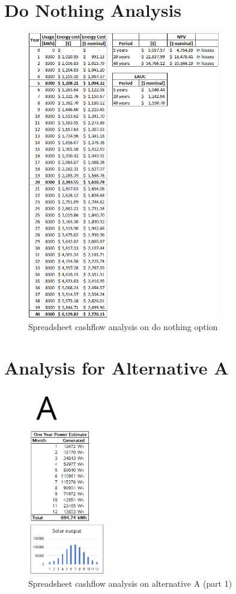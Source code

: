 \documentclass[10pt,letterpaper]{article}
\begin{document}
\clearpage
\section{Do Nothing Analysis}\label{appendix:nothing}
\begin{figure}[H]
	\centering
	\includegraphics[width=0.75\textwidth]{assets/1534569137295}
	\caption{Spreadsheet cashflow analysis on do nothing option}
\end{figure}

\clearpage
\section{Analysis for Alternative A}\label{appendix:a}
\begin{figure}[H]
	\centering
	\includegraphics[width=0.3\textwidth]{assets/1534569236076}
	\caption{Spreadsheet cashflow analysis on alternative A (part 1)}
\end{figure}
\end{document}
